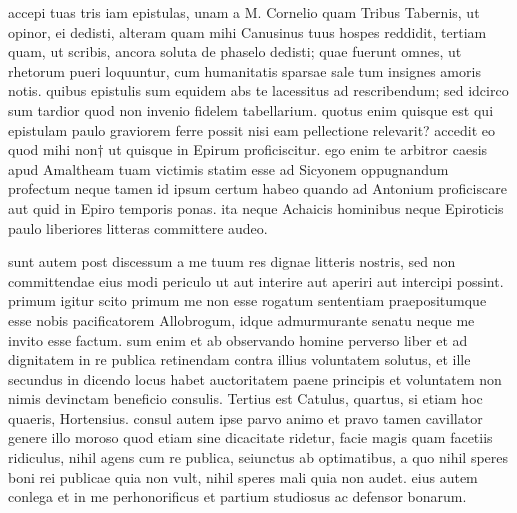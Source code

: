 


 accepi tuas tris iam epistulas, unam a M. Cornelio quam Tribus Tabernis, ut opinor, ei dedisti, alteram quam mihi Canusinus tuus hospes reddidit, tertiam quam, ut scribis, ancora soluta de phaselo dedisti; quae fuerunt omnes, ut rhetorum pueri loquuntur, cum humanitatis sparsae sale tum insignes amoris notis. quibus epistulis sum equidem abs te lacessitus ad rescribendum; sed idcirco sum tardior quod non invenio fidelem tabellarium. quotus enim quisque est qui epistulam paulo graviorem ferre possit nisi eam pellectione relevarit? accedit eo quod mihi non† ut quisque in Epirum proficiscitur. ego enim te arbitror caesis apud Amaltheam tuam victimis statim esse ad Sicyonem oppugnandum profectum neque tamen id ipsum certum habeo quando ad Antonium proficiscare aut quid in Epiro temporis ponas. ita neque Achaicis hominibus neque Epiroticis paulo liberiores litteras committere audeo.

 sunt autem post discessum a me tuum res dignae litteris nostris, sed non committendae eius modi periculo ut aut interire aut aperiri aut intercipi possint. primum igitur scito primum me non esse rogatum sententiam praepositumque esse nobis pacificatorem Allobrogum, idque admurmurante senatu neque me invito esse factum. sum enim et ab observando homine perverso liber et ad dignitatem in re publica retinendam contra illius voluntatem solutus, et ille secundus in dicendo locus habet auctoritatem paene principis et voluntatem non nimis devinctam beneficio consulis. Tertius est Catulus, quartus, si etiam hoc quaeris, Hortensius. consul autem ipse parvo animo et pravo tamen cavillator genere illo moroso quod etiam sine dicacitate ridetur, facie magis quam facetiis ridiculus, nihil agens cum re publica, seiunctus ab optimatibus, a quo nihil speres boni rei publicae quia non vult, nihil speres mali quia non audet. eius autem conlega et in me perhonorificus et partium studiosus ac defensor bonarum.

